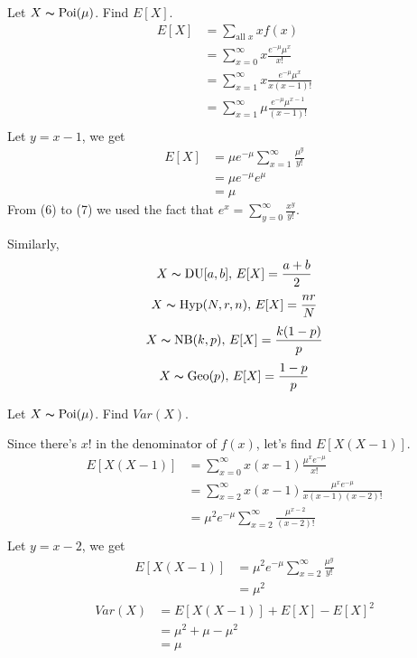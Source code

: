 Let $ X \thicksim \operatorname{Poi}(\mu) $. Find $ E[X] $.
\setcounter{equation}{0}
\begin{align}
    E[X]&=\sum\limits_{\text{all } x}xf(x)\\
    &=\sum\limits_{x=0}^{\infty} x \frac{e^{-\mu}\mu^x}{x!}\\
    &=\sum\limits_{x=1}^{\infty} x \frac{e^{-\mu}\mu^x}{x(x-1)!}\\
    &=\sum\limits_{x=1}^{\infty} \mu \frac{e^{-\mu}\mu^{x-1}}{(x-1)!}\\
\end{align}
Let $ y=x-1 $, we get
\begin{align}
    E[X]&=\mu e^{-\mu}\sum\limits_{x=1}^{\infty} \frac{\mu^{y}}{y!}\\
    &=\mu e^{-\mu}e^\mu\\
    &=\mu
\end{align}
From (6) to (7) we used the fact that $ e^x=\sum\limits_{y=0}^{\infty}\frac{x^y}{y!} $.

Similarly,
\[ X \thicksim \operatorname{DU}[a,b],\, E[X]=\frac{a+b}{2} \]
\[ X \thicksim \operatorname{Hyp}(N,r,n),\, E[X]=\frac{nr}{N} \]
\[ X \thicksim \operatorname{NB}(k,p),\,E[X]=\frac{k(1-p)}{p} \]
\[ X \thicksim \operatorname{Geo}(p),\,E[X]=\frac{1-p}{p} \]

Let $ X \thicksim \operatorname{Poi}(\mu) $. Find $ Var(X) $.

Since there's $ x! $ in the denominator of $ f(x) $, let's find
$ E[X(X-1)] $.
\begin{align*}
    E[X(X-1)]&=\sum\limits_{x=0}^{\infty}x(x-1)\frac{\mu^xe^{-\mu}}{x!}\\
    &=\sum\limits_{x=2}^{\infty}x(x-1)\frac{\mu^xe^{-\mu}}{x(x-1)(x-2)!}\\
    &=\mu^2e^{-\mu}\sum\limits_{x=2}^{\infty} \frac{\mu^{x-2}}{(x-2)!}\\
\end{align*}
Let $ y=x-2 $, we get
\begin{align*}
    E[X(X-1)]&=\mu^2e^{-\mu}\sum\limits_{x=2}^{\infty} \frac{\mu^{y}}{y!}\\
    &=\mu^2
\end{align*}
\begin{align*}
    Var(X)&=E[X(X-1)]+E[X]-E[X]^2\\
    &=\mu^2+\mu-\mu^2\\
    &=\mu
\end{align*}

